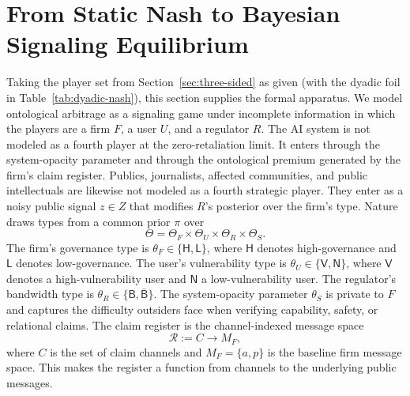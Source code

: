 \section{From Static Nash to Bayesian Signaling Equilibrium}
\label{sec:bayesian}

Taking the player set from Section~\ref{sec:three-sided} as given (with the dyadic foil in Table~\ref{tab:dyadic-nash}), this section supplies the formal apparatus. We model ontological arbitrage as a signaling game under incomplete information in which the players are a firm $F$, a user $U$, and a regulator $R$. The AI system is not modeled as a fourth player at the zero-retaliation limit. It enters through the system-opacity parameter and through the ontological premium generated by the firm's claim register. Publics, journalists, affected communities, and public intellectuals are likewise not
modeled as a fourth strategic player. They enter as a noisy public signal
$z \in Z$ that modifies $R$'s posterior over the firm's type. Nature draws
types from a common prior $\pi$ over
\[
\Theta =
\Theta_F \times \Theta_U \times \Theta_R \times \Theta_S .
\]
The firm's governance type is
$\theta_F \in \{\mathsf{H},\mathsf{L}\}$, where $\mathsf{H}$ denotes
high-governance and $\mathsf{L}$ denotes low-governance. The user's vulnerability
type is $\theta_U \in \{\mathsf{V},\mathsf{N}\}$, where $\mathsf{V}$ denotes a
high-vulnerability user and $\mathsf{N}$ a low-vulnerability user. The
regulator's bandwidth type is $\theta_R \in \{\mathsf{B},\bar{\mathsf{B}}\}$.
The system-opacity parameter $\theta_S$ is private to $F$ and captures the
difficulty outsiders face when verifying capability, safety, or relational
claims.
The claim register is the channel-indexed message space
\[
\mathcal{R} := C \to M_F,
\]
where $C$ is the set of claim channels and $M_F=\{a,p\}$ is the baseline firm
message space. This makes the register a function from channels to the
underlying public messages.

